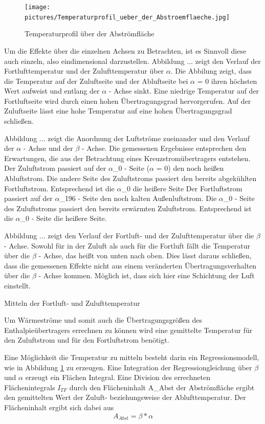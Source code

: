 \begin{figure} [h]
	\centering
	\texttt{[image: pictures/Temperaturprofil\_ueber\_der\_Abstroemflaeche.jpg]}
	\caption{Temperaturprofil über der Abströmfläche}
	\label{Temperaturprofil_ueber_der_Abstroemflaeche}
\end{figure}


Um die Effekte über die einzelnen Achsen zu Betrachten, ist es Sinnvoll diese auch einzeln, also eindimensional darzustellen. Abbildung ... zeigt den Verlauf der Fortlufttemperatur und der Zulufttemperatur über $\alpha$.
Die Abbilung zeigt, dass die Temperatur auf der Zuluftseite und der Abluftseite bei $\alpha$ = 0 ihren höchsten Wert aufweist und entlang der $\alpha$ - Achse sinkt. Eine niedrige Temperatur auf der Fortluftseite wird durch einen hohen Übertragungsgrad hervorgerufen. Auf der Zuluftseite lässt eine hohe Temperatur auf eine hohen Übertragungsgrad schließen.

Abbildung ... zeigt die Anordnung der Luftströme zueinander und den Verlauf der $\alpha$ - Achse und der  $\beta$ - Achse. Die gemessenen Ergebnisse entsprechen den Erwartungen, die aus der Betrachtung eines Kreuzstromübertragers entstehen. Der Zuluftstrom passiert auf der  $\alpha$_{0} - Seite ($\alpha$ = 0) den noch heißen Abluftstrom. Die andere Seite des Zuluftstroms passiert den bereits abgekühlten Fortluftstrom. Entsprechend ist die  $\alpha$_{0} die heißere Seite
Der Fortluftstrom passiert auf der $\alpha$_{196} - Seite den noch kalten Außenluftstrom. Die  $\alpha$_{0} - Seite des Zuluftstroms passiert den bereits erwärmten Zuluftstrom. Entsprechend ist die  $\alpha$_{0} - Seite die heißere Seite.

Abbildung ... zeigt den Verlauf der Fortluft- und der Zulufttemperatur über die $\beta$ - Achse. Sowohl für in der Zuluft als auch für die Fortluft fällt die Temperatur über die $\beta$ - Achse, das heißt von unten nach oben. Dies lässt daraus schließen, dass die gemessenen Effekte nicht aus einem veränderten Übertragungsverhalten über die $\beta$ - Achse kommen. Möglich ist, dass sich hier eine Schichtung der Luft einstellt.
 
Mitteln der Fortluft- und Zulufttemperatur

Um Wärmeströme und somit auch die Übertragungsgrößen des Enthalpieübertragers errechnen zu können wird eine gemittelte Temperatur für den Zuluftstrom und für den Fortluftstrom benötigt.

Eine Möglichkeit die Temperatur zu mitteln besteht darin ein Regressionsmodell, wie in Abbildung \ref{Temperaturprofil_ueber_der_Abstroemflaeche} zu erzeugen. Eine Integration der Regressiongleichung über $\beta$ und $\alpha$ erzeugt ein Flächen Integral. Eine Division des errechneten Flächenintegrals $I_{TF}$ durch den Flächeninhalt A_{Abst} der Abströmfläche ergibt den gemittelten Wert der Zuluft- beziehungsweise der Ablufttemperatur. Der Flächeninhalt ergibt sich dabei aus
\begin{equation}
A_{Abst}= \beta*\alpha
\end{equation}

